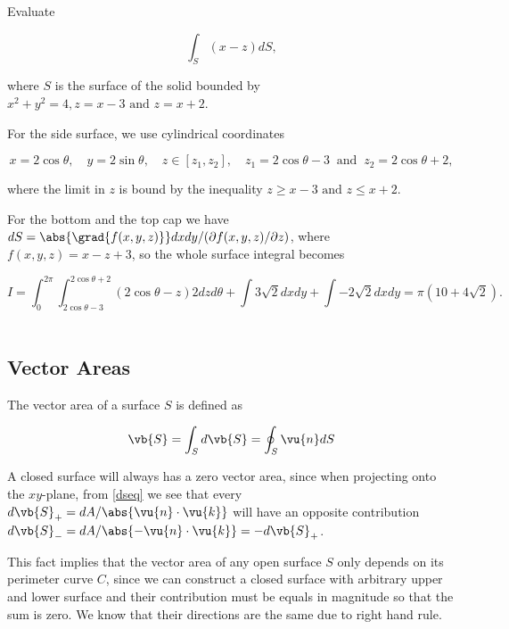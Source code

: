 \documentclass[english,a4paper,12pt]{report}
\begin{document}
{Evaluate 

\begin{equation}
	\int_{S}^{} (x-z) dS,  
\end{equation}

where \(S\) is the surface of the solid bounded by \(x^2+y^2=4, z = x -3 \text { and } z = x+2\).  
}
{For the side surface, we use cylindrical coordinates 

\begin{equation}
	x = 2 \cos \theta , \quad y = 2 \sin \theta , \quad z \in [z_1 ,z_2 ], \quad z_1 = 2 \cos \theta - 3 ~\text { and }~ z_2 = 2 \cos \theta +2,
\end{equation}

where the limit in \(z\) is bound by the inequality \(z \ge x-3 \text { and } z \le x+2\).

For the bottom and the top cap we have \(dS = \abs{\grad{f(x,y,z)} } dxdy / (\partial f (x,y,z)  / \partial z) \), where \(f(x,y,z) = x-z+3\), so the whole surface integral becomes

\begin{equation}
	I = \int_{0}^{2\pi } \int_{2 \cos \theta -3}^{2\cos \theta +2} (2 \cos \theta -z) 2dz d \theta + \int 3 \sqrt{2}dxdy + \int -2 \sqrt{2} dxdy = \pi (10+4\sqrt{2} ).        
\end{equation}
~
} 



\subsection{Vector Areas}

The vector area of a surface \(S\) is defined as

\begin{equation}
	\vb{S}  = \int_{S}^{} d\vb{S} = \oint_{S} \vu{n} dS
\end{equation}

A closed surface will always has a zero vector area, since when projecting onto the \(xy\)-plane, from \cref{dseq} we see that every \( d\vb{S} _{+}  = dA/\abs{\vu{n} \cdot \vu{k} }\) will have an opposite contribution \( d\vb{S} _{-} = dA/\abs{- \vu{n} \cdot \vu{k} } = -d\vb{S} _{+} \). 

This fact implies that the vector area of any open surface \(S\) only depends on its perimeter curve \(C\), since we can construct a closed surface with arbitrary upper and lower surface and their contribution must be equals in magnitude so that the sum is zero. We know that their directions are the same due to right hand rule. 
\end{document}
